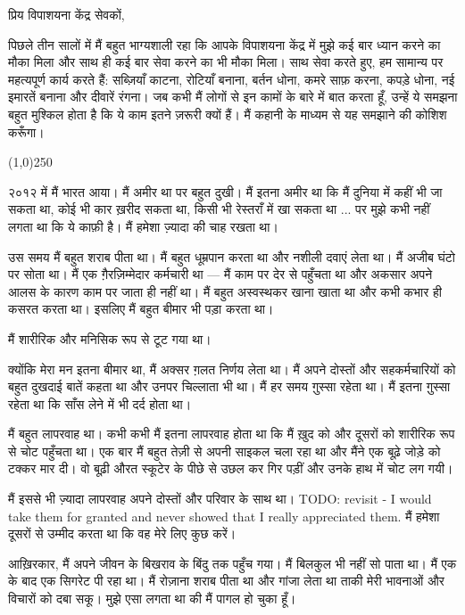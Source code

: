 \documentclass{article}
\begin{document}
प्रिय विपाशयना केंद्र सेवकों,

पिछले तीन सालों में मैं बहुत भाग्यशाली रहा कि आपके विपाशयना केंद्र में मुझे कई बार ध्यान करने का मौका मिला और साथ
ही कई बार सेवा करने का भी मौका मिला। साथ सेवा करते हुए, हम सामान्य पर महत्यपूर्ण कार्य करते हैं: सब्ज़ियाँ काटना, रोटियाँ
बनाना, बर्तन धोना, कमरे साफ़ करना, कपड़े धोना, नई इमारतें बनाना और दीवारें रंगना। जब कभी मैं
लोगों से इन कामों के बारे में बात करता हूँ, उन्हें ये समझना बहुत मुश्किल होता है कि ये काम इतने ज़रूरी क्यों हैं।
मैं कहानी के माध्यम से यह समझाने की कोशिश करूँगा।


\begin{center}
\line(1,0){250}
\end{center}

२०१२ में मैं भारत आया। मैं अमीर था पर बहुत दुखी। मैं इतना अमीर था कि मैं दुनिया में कहीं भी जा सकता
था, कोई भी कार ख़रीद सकता था, किसी भी रेस्तराँ में खा सकता था ... पर मुझे कभी
नहीं लगता था कि ये काफ़ी है। मैं हमेशा ज़्यादा की चाह रखता था।

उस समय मैं बहुत शराब पीता था। मैं बहुत धूम्रपान करता था और नशीली दवाएं लेता था। मैं अजीब घंटो पर सोता
था। मैं एक ग़ैरज़िम्मेदार कर्मचारी था --- मैं काम पर देर से पहुँचता था और अकसार अपने आलस के कारण
काम पर जाता ही नहीं था। मैं बहुत अस्वस्थकर खाना खाता था और कभी कभार ही कसरत करता था। इसलिए मैं
बहुत बीमार भी पड़ा करता था।

मैं शारीरिक और मनिसिक रूप से टूट गया था।

क्योंकि मेरा मन इतना बीमार था, मैं अक्सर ग़लत निर्णय लेता था। मैं अपने दोस्तों और सहकर्मचारियों को बहुत
दुखदाई बातें कहता था और उनपर चिल्लाता भी था। मैं हर समय ग़ुस्सा रहेता था। मैं इतना ग़ुस्सा रहेता था
कि साँस लेने में भी दर्द होता था।

मैं बहुत लापरवाह था। कभी कभी मैं इतना लापरवाह होता था कि मैं ख़ुद को और दूसरों को शारीरिक रूप से
चोट पहुँचता था। एक बार मैं बहुत तेज़ी से अपनी साइकल चला रहा था और मैंने एक बूढ़े जोड़े को टक्कर मार दी। वो बूढ़ी औरत स्कूटेर के पीछे से उछल कर गिर पड़ीं और उनके हाथ में चोट लग गयी। 

मैं इससे भी ज़्यादा लापरवाह अपने दोस्तों और
परिवार के साथ था। TODO: revisit - I would take them for granted and never showed that I really
appreciated them. मैं हमेशा दूसरों से उम्मीद करता था कि वह मेरे लिए कुछ करें।

आख़िरकार, मैं अपने जीवन के बिखराव के बिंदु तक पहुँच गया। मैं बिलकुल भी नहीं सो पाता था। मैं एक के
बाद एक सिगरेट पी रहा था। मैं रोज़ाना शराब पीता था और गांजा लेता था ताकी मेरी भावनाओं और विचारों
को दबा सकू। मुझे एसा लगता था की मैं पागल हो चुका हूँ।
\end{document}
